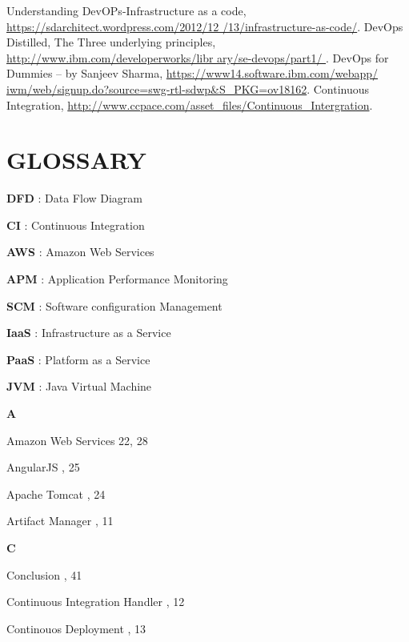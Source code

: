 \documentclass[12pt,a4paper,oneside]{report}
\begin{document}
{\begin{thebibliography}{999}
Understanding DevOPs-Infrastructure as a code,\hspace{2pt}
 \url{https://sdarchitect.wordpress.com/2012/12
/13/infrastructure-as-code/}.
 DevOps Distilled, The Three underlying principles, \url{ http://www.ibm.com/developerworks/libr ary/se-devops/part1/ }. 
DevOps for Dummies – by Sanjeev Sharma, \url{https://www14.software.ibm.com/webapp/ iwm/web/signup.do?source=swg-rtl-sdwp&S_PKG=ov18162}.
Continuous Integration, \url{http://www.ccpace.com/asset_files/Continuous_Intergration}.
\end{thebibliography}
\chapter*{GLOSSARY}
\textbf{DFD}  : Data Flow Diagram
\par \textbf{CI} : Continuous Integration
 \par \textbf{AWS} : Amazon Web Services
\par \textbf{APM} : Application Performance Monitoring
\par  \textbf{SCM} : Software configuration Management
\par \textbf{IaaS} : Infrastructure as a Service
\par \textbf{PaaS} : Platform as a Service
\par \textbf{JVM} : Java Virtual Machine

\begin{theindex}

\rhead{\empty}
\lhead{\empty}
\lfoot{\empty}
\vspace{.2in}
\large\textbf{A}
\item  Amazon Web Services 22, 28
\item  AngularJS , 25
\item Apache Tomcat  , 24
\item Artifact Manager , 11
\vspace{.2in}

\large\textbf{C}
\item Conclusion , 41
\item  Continuous Integration Handler , 12
\item Continouos Deployment , 13
\vspace{.2in}


\end{theindex}}
\end{document}

